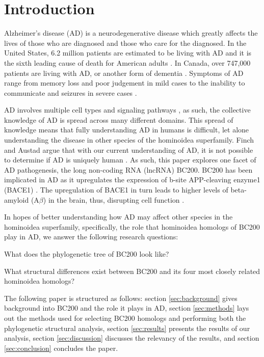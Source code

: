 \documentclass[conference, 11pt]{IEEEtran}
\begin{document}
\section{Introduction}\label{sec:intro}

Alzheimer's disease (AD) is a neurodegenerative disease which greatly affects the lives of those who are diagnosed and those who care for the diagnosed. 
In the United States, 6.2 million patients are estimated to be living with AD and it is the sixth leading cause of death for American adults \cite{AlzheimersDisease}. 
In Canada, over 747,000 patients are living with AD, or another form of dementia \cite{ADcanada}. 
Symptoms of AD range from memory loss and poor judgement in mild cases to the inability to communicate and seizures in severe cases \cite{alzheimersSigns}.

AD involves multiple cell types and signaling pathways \cite{zhang2021role}, as such, the collective knowledge of AD is spread across many different domains. 
This spread of knowledge means that fully understanding AD in humans is difficult, let alone understanding the disease in other species of the hominoidea superfamily.
Finch and Austad argue that with our current understanding of AD, it is not possible to determine if AD is uniquely human \cite{finch2015commentary}. 
As such, this paper explores one facet of AD pathogenesis, the long non-coding RNA (lncRNA) BC200. 
BC200 has been implicated in AD as it upregulates the expression of b-site APP-cleaving enzyme1 (BACE1) \cite{li2018identification,zhang2021role}. 
The upregulation of BACE1 in turn leads to higher levels of beta-amyloid (A$\beta$) in the brain, thus, disrupting cell function \cite{li2018identification,zhang2021role}. 

In hopes of better understanding how AD may affect other species in the hominoidea superfamily, specifically, the role that hominoidea homologs of BC200 play in AD, we answer the following research questions:

\begin{questions}
  \item What does the phylogenetic tree of BC200 look like?
  \item What structural differences exist between BC200 and its four most closely related hominoidea homologs?
\end{questions}

The following paper is structured as follows: section \ref{sec:background} gives background into BC200 and the role it plays in AD, section \ref{sec:methods} lays out the methods used for selecting BC200 homologs and performing both the phylogenetic structural analysis, section \ref{sec:results} presents the results of our analysis, section \ref{sec:discussion} discusses the relevancy of the results, and section \ref{sec:conclusion} concludes the paper.
\end{document}
